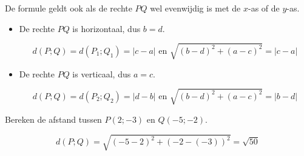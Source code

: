 De formule geldt ook als de rechte $PQ$ wel evenwijdig is met de $x$-as of de $y$-as.
\begin{itemize}
\item De rechte $PQ$ is horizontaal, dus $b=d$.

\begin{center}

\end{center}



\[
d(P;Q)=d(P_1;Q_1)=\vert c-a \vert \text { en } \sqrt { (b-d)^2+(a-c)^2 }=\vert c-a \vert
\]
\item De rechte $PQ$ is verticaal, dus $a=c$.

\begin{center}
	
\end{center}

\[
d(P;Q)=d(P_2;Q_2)=\vert d-b \vert \text { en } \sqrt { (b-d)^2+(a-c)^2 }=\vert b-d \vert
\]
\end{itemize}\vspace{2mm}

\newpage

\begin{voorbeeld}
Bereken de afstand tussen $P(2;-3)$ en $Q(-5;-2)$.

\begin{center}
		
\end{center}


\[
d(P;Q)=\sqrt{(-5-2)^2+(-2-(-3))^2}=\sqrt{50}
\]\vspace{3mm}

\end{voorbeeld}

